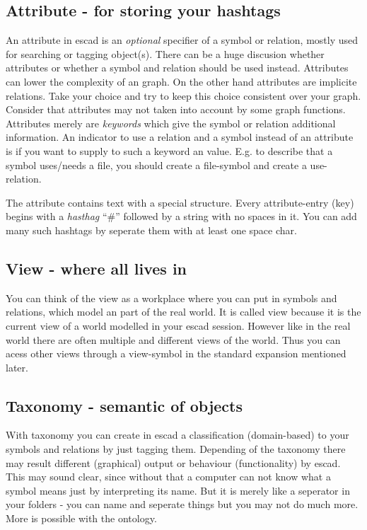 \documentclass[a4paper, 12pt, openany]{scrbook}
\begin{document}
\subsection{Attribute - for storing your hashtags}
An attribute in escad is an \emph{optional} specifier of a symbol or relation, mostly used for searching or tagging object(s). There can be a huge discusion whether attributes or whether a symbol and relation should be used instead. Attributes can lower the complexity of an graph. On the other hand attributes are implicite relations. Take your choice and try to keep this choice consistent over your graph. Consider that attributes may not taken into account by some graph functions. Attributes merely are \emph{keywords} which give the symbol or relation additional information. An indicator to use a relation and a symbol instead of an attribute is if you want to supply to such a keyword an value. E.g. to describe that a symbol uses/needs a file, you should create a file-symbol and create a use-relation.

The attribute contains text with a special structure. Every attribute-entry (key) begins with a \emph{hasthag} ``\#'' followed by a string with no spaces in it. You can add many such hashtags by seperate them with at least one space char.
\subsection{View - where all lives in}
You can think of the view as a workplace where you can put in symbols and relations, which model an part of the real world. It is called view because it is the current view of a world modelled in your escad session. However like in the real world there are often multiple and different views of the world. Thus you can acess other views through a view-symbol in the standard expansion mentioned later.
\subsection{Taxonomy - semantic of objects}
With taxonomy you can create in escad a classification (domain-based) to your symbols and relations by just tagging them. Depending of the taxonomy there may result different (graphical) output or behaviour (functionality) by escad. This may sound clear, since without that a computer can not know what a symbol means just by interpreting its name. But it is merely like a seperator in your folders - you can name and seperate things but you may not do much more. More is possible with the ontology.
\end{document}
